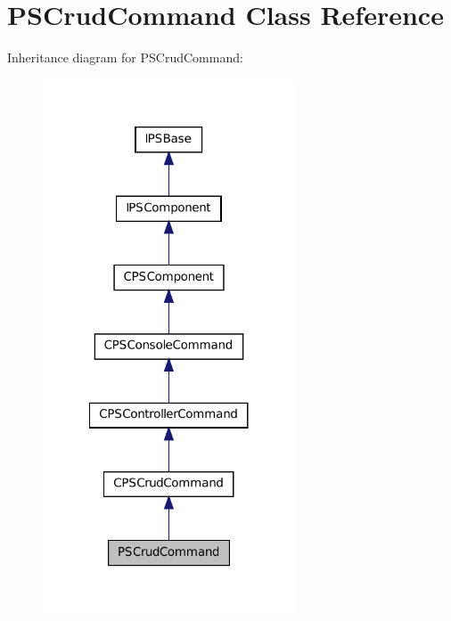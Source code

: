 \hypertarget{classPSCrudCommand}{
\section{PSCrudCommand Class Reference}
\label{classPSCrudCommand}
}


Inheritance diagram for PSCrudCommand:\nopagebreak
\begin{figure}[H]
\begin{center}
\leavevmode
\includegraphics[width=212pt]{classPSCrudCommand__inherit__graph}
\end{center}
\end{figure}


